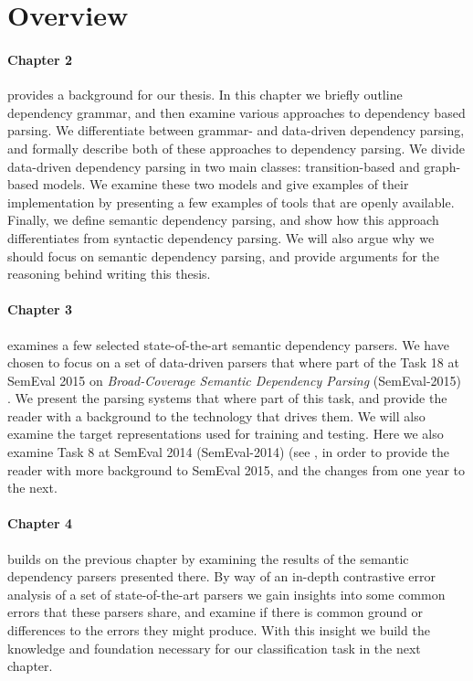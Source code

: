\section{Overview} 

\paragraph{Chapter 2} provides a background for our thesis. In this chapter we briefly outline dependency grammar, and then examine various approaches to dependency based parsing. We differentiate between grammar- and data-driven dependency parsing, and formally describe both of these approaches to dependency parsing. We divide data-driven dependency parsing in two main classes: transition-based and graph-based models. We examine these two models and give examples of their implementation by presenting a few examples of tools that are openly available. Finally, we define semantic dependency parsing, and show how this approach differentiates from syntactic dependency parsing. We will also argue why we should focus on semantic dependency parsing, and provide arguments for the reasoning behind writing this thesis.

\paragraph{Chapter 3} examines a few selected state-of-the-art semantic dependency parsers. We have chosen to focus on a set of data-driven parsers that where part of the Task 18 at SemEval 2015 on \textit{Broad-Coverage Semantic Dependency Parsing} (SemEval-2015) \cite{Oepen:15}. We present the parsing systems that where part of this task, and provide the reader with a background to the technology that drives them. We will also examine the target representations used for training and testing. Here we also examine Task 8 at SemEval 2014 (SemEval-2014) (see , in order to provide the reader with more background to SemEval 2015, and the changes from one year to the next.

\paragraph{Chapter 4} builds on the previous chapter by examining the results of the semantic dependency parsers presented there. By way of an in-depth contrastive error analysis of a set of state-of-the-art parsers we gain insights into some common errors that these parsers share, and examine if there is common ground or differences to the errors they might produce. With this insight we build the knowledge and foundation necessary for our classification task in the next chapter. 

